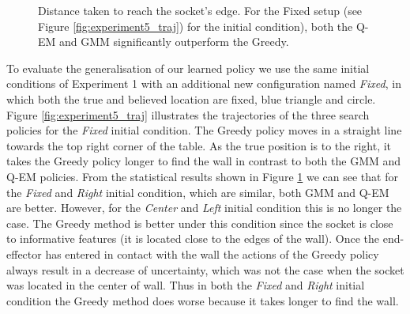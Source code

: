 \documentclass[final,3p,times,twocolumn]{elsarticle}
\begin{document}
\begin{figure}
 \centering
    \caption{Distance taken to reach the socket's edge. For the Fixed setup (see Figure \ref{fig:experiment5_traj}) for 
    the initial condition), both the Q-EM and GMM significantly outperform the Greedy. }
    \label{fig:experiment5_stats}
\end{figure}

To evaluate the generalisation of our learned policy we use the same initial conditions of Experiment 1 with an additional 
new configuration named \textit{Fixed}, in which both the true and believed location are fixed, blue triangle and circle.
Figure \ref{fig:experiment5_traj} illustrates the trajectories of the three search policies for the \textit{Fixed} initial condition. 
The Greedy policy moves in a straight line towards the top
right corner of the table. As the true position is to the right, it takes the Greedy policy longer to find the wall 
in contrast to both the GMM and Q-EM policies. From the statistical results shown in Figure \ref{fig:experiment5_stats} we can see
that for the \textit{Fixed} and \textit{Right} initial condition, which are similar, both GMM and Q-EM are better. However, for 
the \textit{Center} and \textit{Left} initial condition this is no longer the case. 
The Greedy method is better under this condition since the socket is close to informative features (it is located close to the edges of the wall). 
Once the end-effector has entered in contact with the wall the actions of the Greedy policy always result in a decrease of uncertainty, which was not the case when the socket was located in the center of wall. 
Thus in both the \textit{Fixed} and \textit{Right} initial condition the Greedy method does worse because it takes longer
to find the wall.
\end{document}
